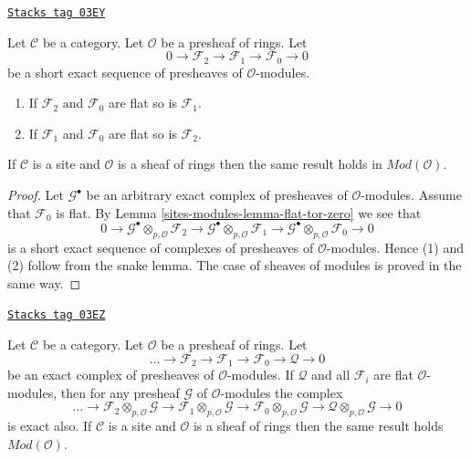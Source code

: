 \begin{lemma}
\label{sites-modules-lemma-flat-ses}
\href{https://stacks.math.columbia.edu/tag/03EY}{\texttt{Stacks tag 03EY}}

Let $\mathcal{C}$ be a category.
Let $\mathcal{O}$ be a presheaf of rings.
Let
$$
0 \to
\mathcal{F}_2 \to
\mathcal{F}_1 \to
\mathcal{F}_0 \to 0
$$
be a short exact sequence of presheaves of $\mathcal{O}$-modules.
\begin{enumerate}
\item If $\mathcal{F}_2$ and $\mathcal{F}_0$ are flat so is
$\mathcal{F}_1$.
\item If $\mathcal{F}_1$ and $\mathcal{F}_0$ are flat so is
$\mathcal{F}_2$.
\end{enumerate}
If $\mathcal{C}$ is a site and $\mathcal{O}$ is a
sheaf of rings then the same result holds in $\textit{Mod}(\mathcal{O})$.
\end{lemma}

\begin{proof}
Let $\mathcal{G}^\bullet$ be an arbitrary exact complex of presheaves
of $\mathcal{O}$-modules. Assume that $\mathcal{F}_0$ is flat.
By Lemma \ref{sites-modules-lemma-flat-tor-zero} we see that
$$
0 \to
\mathcal{G}^\bullet \otimes_{p, \mathcal{O}} \mathcal{F}_2 \to
\mathcal{G}^\bullet \otimes_{p, \mathcal{O}} \mathcal{F}_1 \to
\mathcal{G}^\bullet \otimes_{p, \mathcal{O}} \mathcal{F}_0 \to 0
$$
is a short exact sequence of complexes of presheaves of
$\mathcal{O}$-modules. Hence (1) and (2) follow from the snake lemma.
The case of sheaves of modules is proved in the same way.
\end{proof}

\begin{lemma}
\label{sites-modules-lemma-flat-resolution-of-flat}
\href{https://stacks.math.columbia.edu/tag/03EZ}{\texttt{Stacks tag 03EZ}}

Let $\mathcal{C}$ be a category.
Let $\mathcal{O}$ be a presheaf of rings.
Let
$$
\ldots \to
\mathcal{F}_2 \to
\mathcal{F}_1 \to
\mathcal{F}_0 \to
\mathcal{Q} \to 0
$$
be an exact complex of presheaves of $\mathcal{O}$-modules.
If $\mathcal{Q}$ and all $\mathcal{F}_i$ are flat $\mathcal{O}$-modules,
then for any presheaf $\mathcal{G}$ of $\mathcal{O}$-modules the
complex
$$
\ldots \to
\mathcal{F}_2 \otimes_{p, \mathcal{O}} \mathcal{G} \to
\mathcal{F}_1 \otimes_{p, \mathcal{O}} \mathcal{G} \to
\mathcal{F}_0 \otimes_{p, \mathcal{O}} \mathcal{G} \to
\mathcal{Q} \otimes_{p, \mathcal{O}} \mathcal{G} \to 0
$$
is exact also. If $\mathcal{C}$ is a site and $\mathcal{O}$ is a
sheaf of rings then the same result holds $\textit{Mod}(\mathcal{O})$.
\end{lemma}

